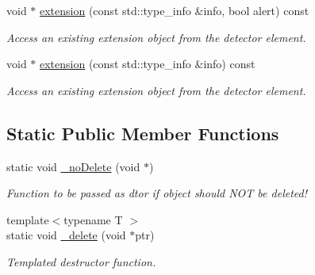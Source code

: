 \begin{DoxyCompactItemize}
void $\ast$ \hyperlink{class_d_d4hep_1_1_object_extensions_ae1ea9d894574f33c63ea3d44427f4c0c}{extension} (const std::type\_\-info \&info, bool alert) const 
\begin{DoxyCompactList}\small\item\em Access an existing extension object from the detector element. \item\end{DoxyCompactList}\item 
void $\ast$ \hyperlink{class_d_d4hep_1_1_object_extensions_ae12b64d5f695d41e521d2d55711d4dfc}{extension} (const std::type\_\-info \&info) const 
\begin{DoxyCompactList}\small\item\em Access an existing extension object from the detector element. \item\end{DoxyCompactList}\end{DoxyCompactItemize}
\subsection*{Static Public Member Functions}
\begin{DoxyCompactItemize}
\item 
static void \hyperlink{class_d_d4hep_1_1_object_extensions_a0c32fb2af89407102b494ab9c15f9eac}{\_\-noDelete} (void $\ast$)
\begin{DoxyCompactList}\small\item\em Function to be passed as dtor if object should NOT be deleted! \item\end{DoxyCompactList}\item 
{\footnotesize template$<$typename T $>$ }\\static void \hyperlink{class_d_d4hep_1_1_object_extensions_a558f472ce5f48a832f121a2313cbc70e}{\_\-delete} (void $\ast$ptr)
\begin{DoxyCompactList}\small\item\em Templated destructor function. \item\end{DoxyCompactList}\end{DoxyCompactItemize}
